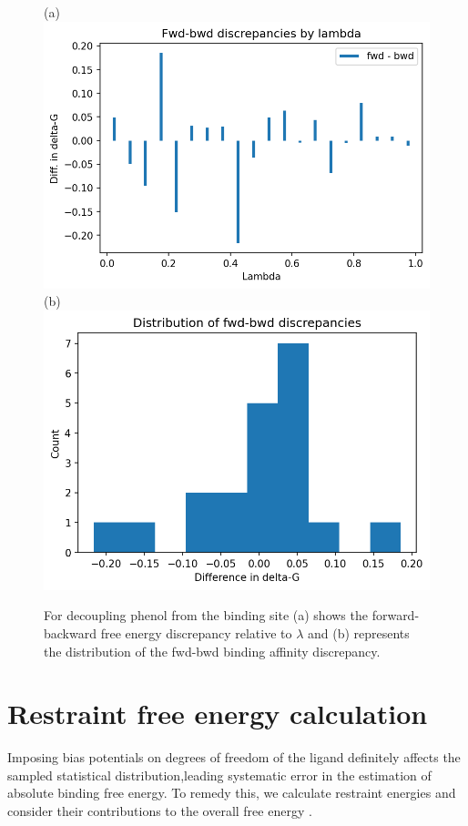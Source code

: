 \documentclass[9pt,tutorial]{livecoms}
\begin{document}
\begin{figure}[h!t]
\centering
(a)
\includegraphics[width=0.8\linewidth]{Supp-Files/AFEP-Bound-Decoupling/output/Alchemlyb/output_7_1.png}
\\
\centering
(b)
\includegraphics[width=0.8\linewidth]{Supp-Files/AFEP-Bound-Decoupling/output/Alchemlyb/output_8_1.png}
\caption{ For decoupling phenol from the binding site (a) shows the forward-backward free energy discrepancy relative to {$\lambda$} and (b) represents the distribution of the fwd-bwd binding affinity discrepancy.}
\label{fig:AFEP-decoupl3}
\end{figure}

\section{Restraint free energy calculation}\label{sec:10}
Imposing bias potentials on degrees of freedom of the ligand definitely affects the sampled statistical distribution,leading systematic error in the estimation of absolute binding free energy. To remedy this, we calculate restraint energies and consider their contributions to the overall free energy \cite{Henin2014,Fu2017}.
\end{document}
